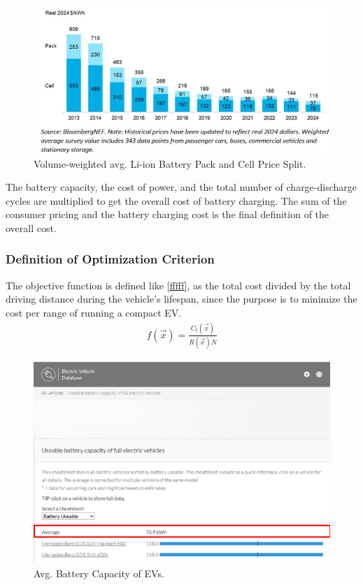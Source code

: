 \documentclass[11pt,twocolumn]{article}
\begin{document}
                \begin{figure}[h]
                    \centering
                    \includegraphics[width=.8\columnwidth]{batVolPrice.png}
                    \caption{Volume-weighted avg. Li-ion Battery Pack and Cell Price Split.}
                    \label{batVolPrice}
                \end{figure}
                The battery capacity, the cost of power, and the total number of charge-discharge cycles are multiplied to get the overall cost of battery charging.
                The sum of the consumer pricing and the battery charging cost is the final definition of the overall cost.
            \subsubsection{Definition of Optimization Criterion}
                The objective function is defined like \cref{fffff}, as the total cost divided by the total driving distance during the vehicle's lifespan, since the purpose is to minimize the cost per range of running a compact EV.
                \begin{align}
                    \label{fffff}
                    f(\vec{x})=\frac{C_{t}(\vec{x})}{R(\vec{x})N}
                \end{align}
                \begin{figure}[h]
                    \centering
                    \includegraphics[width=.8\columnwidth]{avgCap.png}
                    \caption{Avg. Battery Capacity of EVs.}
                    \label{avgCap}
                \end{figure}
\end{document}
